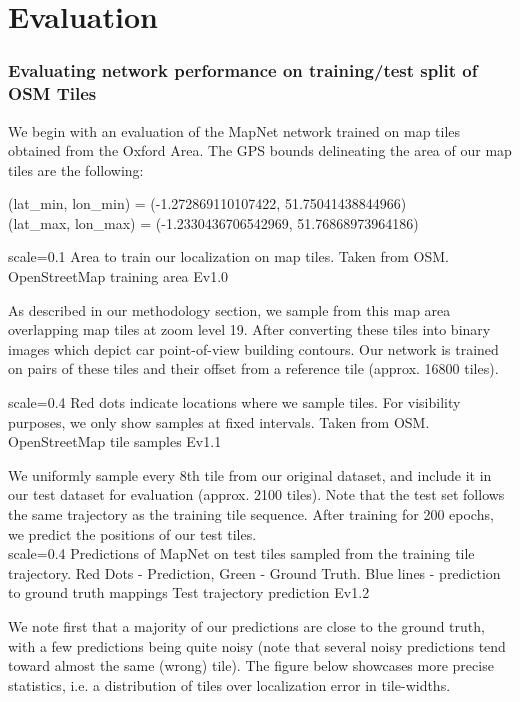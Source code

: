 
\chapter{Evaluation}
\subsection{Evaluating network performance on training/test split of OSM Tiles}
We begin with an evaluation of the MapNet network trained on map tiles obtained from the Oxford Area. The GPS bounds delineating the area of our map tiles are the following:

(lat\_min, lon\_min) = (-1.272869110107422, 51.75041438844966)\\
(lat\_max, lon\_max) = (-1.2330436706542969, 51.76868973964186)

{scale=0.1}%
{Area to train our localization on map tiles. Taken from OSM.}%
{OpenStreetMap training area}%
{Ev1.0}

As described in our methodology section, we sample from this map area overlapping map tiles at zoom level 19. After converting these tiles into binary images which depict car point-of-view building contours. Our network is trained on pairs of these tiles and their offset from a reference tile (approx. 16800 tiles).

{scale=0.4}%
{Red dots indicate locations where we sample tiles. For visibility purposes, we only show samples at fixed intervals. Taken from OSM.}%
{OpenStreetMap tile samples}%
{Ev1.1}

We uniformly sample every 8th tile from our original dataset, and include it in our test dataset for evaluation (approx. 2100 tiles). Note that the test set follows the same trajectory as the training tile sequence. After training for 200 epochs, we predict the positions of our test tiles. 
\\
{scale=0.4}%
{Predictions of MapNet on test tiles sampled from the training tile trajectory. Red Dots - Prediction, Green - Ground Truth. Blue lines - prediction to ground truth mappings}%
{Test trajectory prediction}%
{Ev1.2}

We note first that a majority of our predictions are close to the ground truth, with a few predictions being quite noisy (note that several noisy predictions tend toward almost the same (wrong) tile). The figure below showcases more precise statistics, i.e. a distribution of tiles over localization error in tile-widths.

